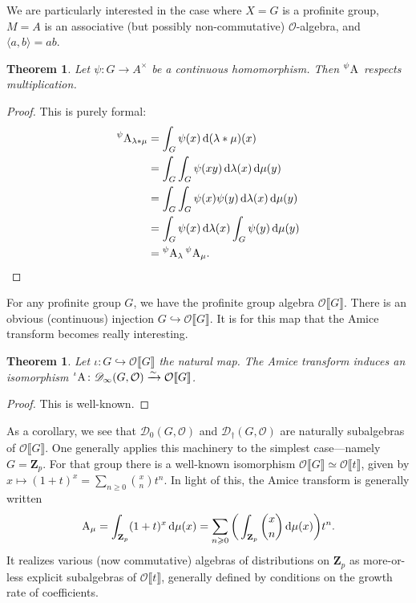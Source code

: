 \documentclass{article}
\newcommand{\bZ}{\mathbf{Z}}
\newcommand{\cO}{\mathcal{O}}
\newcommand{\dd}{\mathrm{d}}
\newcommand{\sD}{\mathscr{D}}
\newcommand{\amice}[2][]{\prescript{#1}{}{\mathrm{A}_{#2}}}
\newcommand{\pow}[1]{\llbracket #1 \rrbracket}
\newtheorem{theorem}[subsection]{Theorem}
\theoremstyle{definition}
\begin{document}
We are particularly interested in the case where $X=G$ is a profinite group, 
$M=A$ is an associative (but possibly non-commutative) $\cO$-algebra, and 
$\langle a,b\rangle = a b$. 

\begin{theorem}
Let $\psi\colon G\to A^\times$ be a continuous homomorphism. Then 
$\amice[\psi]{}$ respects multiplication.
\end{theorem}
\begin{proof}
This is purely formal:
\begin{align*}
  \amice[\psi]{\lambda\ast\mu} 
    &= \int_G \psi(x)\, \dd(\lambda\ast\mu)(x) \\
    &= \int_G \int_G \psi(x y)\, \dd\lambda(x) \, \dd \mu(y) \\
    &= \int_G \int_G \psi(x)\psi(y)\, \dd \lambda(x) \, \dd\mu(y) \\
    &= \int_G \psi(x)\, \dd\lambda(x) \int_G \psi(y) \, \dd\mu(y) \\
    &= \amice[\psi]{\lambda} \amice[\psi]{\mu} .
\end{align*}
\end{proof}

For any profinite group $G$, we have the profinite group algebra $\cO\pow{G}$. 
There is an obvious (continuous) injection $G\hookrightarrow \cO\pow{G}$. It is 
for this map that the Amice transform becomes really interesting. 

\begin{theorem}
Let $\iota\colon G\hookrightarrow \cO\pow{G}$ the natural map. The Amice 
transform induces an isomorphism 
$\amice[\iota]{}\colon \sD_\infty(G,\cO)\xrightarrow\sim\cO\pow{G}$. 
\end{theorem}
\begin{proof}
This is well-known. 
\end{proof}

As a corollary, we see that $\sD_0(G,\cO)$ and $\sD_\dagger(G,\cO)$ are 
naturally subalgebras of $\cO\pow{G}$. One generally applies this machinery to 
the simplest case---namely $G=\bZ_p$. For that group there is a well-known 
isomorphism $\cO\pow{G}\simeq \cO\pow{t}$, given by 
$x\mapsto (1+t)^x=\sum_{n\geqslant 0} \binom{x}{n} t^n$. In light of this, the 
Amice transform is generally written 
\[
  \amice{\mu} = \int_{\bZ_p} (1+t)^x\, \dd\mu(x) = \sum_{n\geqslant 0}\bigg(\int_{\bZ_p} \binom{x}{n}\, \dd\mu(x)\bigg)t^n .
\]
It realizes various (now commutative) algebras of distributions on $\bZ_p$ as 
more-or-less explicit subalgebras of $\cO\pow{t}$, generally defined by 
conditions on the growth rate of coefficients. 
\end{document}
